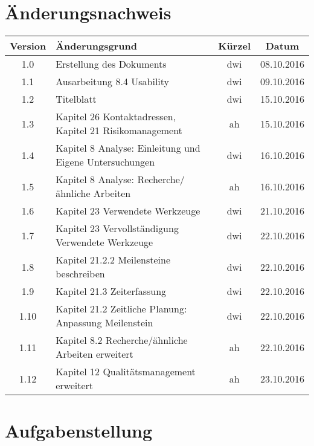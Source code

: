 \documentclass[12pt, a4paper]{report}
\begin{document}
	\chapter{Änderungsnachweis}
	\begin{tabularx}{\linewidth}{|c|X|c|c|}
		\hline
		\textbf{Version} & \textbf{Änderungsgrund} & \textbf{Kürzel} & \textbf{Datum} \\
		\hline
		1.0 & Erstellung des Dokuments & dwi & 08.10.2016 \\
		\hline
		1.1 & Ausarbeitung 8.4 Usability & dwi & 09.10.2016 \\
		\hline
		1.2 & Titelblatt & dwi & 15.10.2016 \\
		\hline
		1.3 & Kapitel 26 Kontaktadressen, \newline Kapitel 21 Risikomanagement & ah & 15.10.2016 \\
		\hline
		1.4 & Kapitel 8 Analyse: Einleitung und Eigene Untersuchungen & dwi & 16.10.2016 \\
		\hline
		1.5 & Kapitel 8 Analyse: Recherche/ähnliche Arbeiten & ah & 16.10.2016 \\
		\hline
		1.6 & Kapitel 23 Verwendete Werkzeuge & dwi & 21.10.2016 \\
		\hline
		1.7 & Kapitel 23 Vervollständigung Verwendete Werkzeuge & dwi & 22.10.2016 \\
		\hline
		1.8 & Kapitel 21.2.2 Meilensteine beschreiben & dwi & 22.10.2016 \\
		\hline
		1.9 & Kapitel 21.3 Zeiterfassung & dwi & 22.10.2016 \\
		\hline
		1.10 & Kapitel 21.2 Zeitliche Planung: Anpassung Meilenstein & dwi & 22.10.2016 \\
		\hline
		1.11 & Kapitel 8.2 Recherche/ähnliche Arbeiten erweitert & ah & 22.10.2016 \\
		\hline
		1.12 & Kapitel 12 Qualitätsmanagement erweitert & ah & 23.10.2016 \\
		\hline
	\end{tabularx}
	
	\listoftodos
	
	
	\tableofcontents
	
	
	\chapter{Aufgabenstellung}
	
\end{document}
